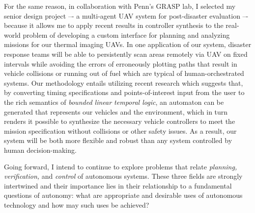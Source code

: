 \documentclass[11pt]{letter}
\begin{document}
For the same reason, in collaboration with Penn’s GRASP lab, I selected my senior design project –- a multi-agent UAV system for post-disaster evaluation –- because it allows me to apply recent results in controller synthesis to the real-world problem of developing a custom interface for planning and analyzing missions for our thermal imaging UAVs.  In one application of our system, disaster response teams will be able to persistently scan areas remotely via UAV on fixed intervals while avoiding the errors of erroneously plotting paths that result in vehicle collisions or running out of fuel which are typical of human-orchestrated systems. Our methodology entails utilizing recent research which suggests that, by converting timing specifications and points-of-interest input from the user to the rich semantics of \emph{bounded linear temporal logic}, an automaton can be generated that represents our vehicles and the environment, which in turn renders it possible to synthesize the necessary vehicle controllers to meet the mission specification without collisions or other safety issues.  As a result, our system will be both more flexible and robust than any system controlled by human decision-making.

Going forward, I intend to continue to explore problems that relate \emph{planning, verification,} and \emph{control} of autonomous systems.  These three fields are strongly intertwined and their importance lies in their relationship to a fundamental questions of autonomy:  what are appropriate and desirable uses of autonomous technology and how may such uses be achieved?
\end{document}
